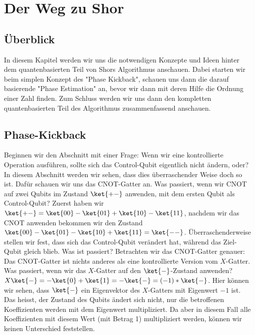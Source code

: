 \chapter{Der Weg zu Shor}
\section{Überblick}
In diesem Kapitel werden wir uns die notwendigen Konzepte und Ideen hinter dem quantenbasierten Teil von Shors Algorithmus anschauen. Dabei starten wir beim simplen Konzept des "Phase Kickback", schauen uns dann die darauf basierende "Phase Estimation" an, bevor wir dann mit deren Hilfe die Ordnung einer Zahl finden. Zum Schluss werden wir uns dann den kompletten quantenbasierten Teil des Algorithmus zusammenfassend anschauen.
\section{Phase-Kickback}
Beginnen wir den Abschnitt mit einer Frage: Wenn wir eine kontrollierte Operation ausführen, sollte sich das Control-Qubit eigentlich nicht ändern, oder? In diesem Abschnitt werden wir sehen, dass dies überraschender Weise doch so ist. Dafür schauen wir uns das CNOT-Gatter an. Was passiert, wenn wir CNOT auf zwei Qubits im Zustand $\ket{+-}$ anwenden, mit dem ersten Qubit als Control-Qubit? Zuerst haben wir $\ket{+-} = \ket{00} - \ket{01} + \ket{10} - \ket{11}$, nachdem wir das CNOT anwenden bekommen wir den Zustand $\ket{00} - \ket{01} - \ket{10} + \ket{11} = \ket{--}$. Überraschenderweise stellen wir fest, dass sich das Control-Qubit verändert hat, während das Ziel-Qubit gleich blieb. Was ist passiert? Betrachten wir das CNOT-Gatter genauer: Das CNOT-Gatter ist nichts anderes als eine kontrollierte Version vom $X$-Gatter. Was passiert, wenn wir das $X$-Gatter auf den $\ket{-}$-Zustand anwenden? $X\ket{-} = -\ket{0} + \ket{1} = -\ket{-} = (-1)*\ket{-}$. Hier können wir sehen, dass $\ket{-}$ ein Eigenvektor des $X$-Gatters mit Eigenwert $-1$ ist. Das heisst, der Zustand des Qubits ändert sich nicht, nur die betroffenen Koeffizienten werden mit dem Eigenwert multipliziert. Da aber in diesem Fall alle Koeffizienten mit diesem Wert (mit Betrag 1) multipliziert werden, können wir keinen Unterschied feststellen.

